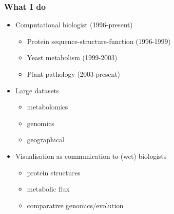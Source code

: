 
\begin{frame}
  \frametitle{What I do}
      \begin{itemize}  
        \item \textcolor{hutton_green}{Computational biologist (1996-present)}
        \begin{itemize}
          \item Protein sequence-structure-function (1996-1999)
          \item Yeast metabolism (1999-2003)
          \item Plant pathology (2003-present)
        \end{itemize}
        \item \textcolor{hutton_blue}{Large datasets}
        \begin{itemize}
          \item metabolomics
          \item genomics
          \item geographical
        \end{itemize}
        \item \textcolor{hutton_purple}{Visualisation as communication to (wet) biologists}
        \begin{itemize}
          \item protein structures
          \item metabolic flux
          \item comparative genomics/evolution
        \end{itemize}
      \end{itemize}  
\end{frame}

